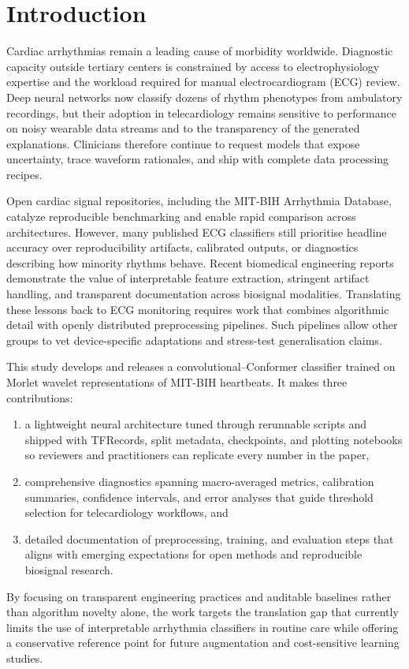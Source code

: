 \section{Introduction}
Cardiac arrhythmias remain a leading cause of morbidity worldwide. Diagnostic capacity outside tertiary centers is constrained by access to electrophysiology expertise and the workload required for manual electrocardiogram (ECG) review. Deep neural networks now classify dozens of rhythm phenotypes from ambulatory recordings, but their adoption in telecardiology remains sensitive to performance on noisy wearable data streams and to the transparency of the generated explanations.\cite{Hannun2019Cardiologist,acharya2017deep,zheng2020residual,jenifer2024yolo} Clinicians therefore continue to request models that expose uncertainty, trace waveform rationales, and ship with complete data processing recipes.

Open cardiac signal repositories, including the MIT-BIH Arrhythmia Database, catalyze reproducible benchmarking and enable rapid comparison across architectures.\cite{Goldberger2000PhysioBank,luz2016ecg} However, many published ECG classifiers still prioritise headline accuracy over reproducibility artifacts, calibrated outputs, or diagnostics describing how minority rhythms behave. Recent biomedical engineering reports demonstrate the value of interpretable feature extraction, stringent artifact handling, and transparent documentation across biosignal modalities.\cite{rahman2024residual,rowlandson2024bridging,spagna2024telecardiology,tison2018passive} Translating these lessons back to ECG monitoring requires work that combines algorithmic detail with openly distributed preprocessing pipelines. Such pipelines allow other groups to vet device-specific adaptations and stress-test generalisation claims.

This study develops and releases a convolutional--Conformer classifier trained on Morlet wavelet representations of MIT-BIH heartbeats. It makes three contributions:
\begin{enumerate}[label=(\roman*),leftmargin=*]
  \item a lightweight neural architecture tuned through rerunnable scripts and shipped with TFRecords, split metadata, checkpoints, and plotting notebooks so reviewers and practitioners can replicate every number in the paper,
  \item comprehensive diagnostics spanning macro-averaged metrics, calibration summaries, confidence intervals, and error analyses that guide threshold selection for telecardiology workflows, and
  \item detailed documentation of preprocessing, training, and evaluation steps that aligns with emerging expectations for open methods and reproducible biosignal research.
\end{enumerate}
By focusing on transparent engineering practices and auditable baselines rather than algorithm novelty alone, the work targets the translation gap that currently limits the use of interpretable arrhythmia classifiers in routine care while offering a conservative reference point for future augmentation and cost-sensitive learning studies.
